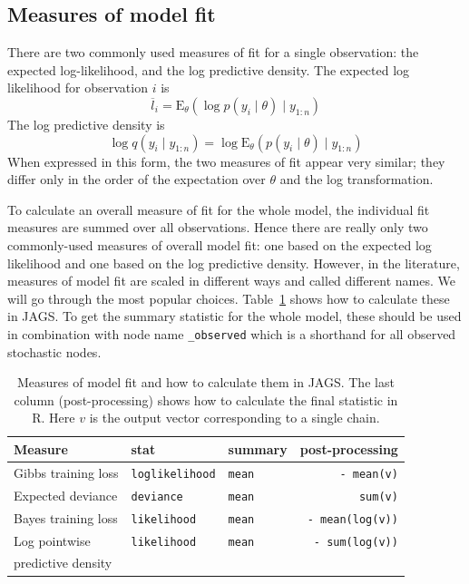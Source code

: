 \documentclass[11pt, a4paper, titlepage]{report}
\newcommand{\JAGS}{\textsf{JAGS}}
\begin{document}
{\subsection{Measures of model fit}
\label{section:fit_measures}

There are two commonly used measures of fit for a single observation:
the expected log-likelihood, and the log predictive density. The
expected log likelihood for observation $i$ is
\[
\overline{l}_i = \text{E}_{\theta} \left( \log p(y_i \mid \theta) \mid y_{1:n}\right)
\]
The log predictive density is
\[
\log q(y_i \mid y_{1:n}) = \log \text{E}_{\theta} \left( p(y_i \mid \theta) \mid y_{1:n} \right)
\]
When expressed in this form, the two measures of fit appear very
similar; they differ only in the order of the expectation over
$\theta$ and the log transformation.

To calculate an overall measure of fit for the whole model, the
individual fit measures are summed over all observations. Hence there
are really only two commonly-used measures of overall model fit: one
based on the expected log likelihood and one based on the log
predictive density. However, in the literature, measures of model fit
are scaled in different ways and called different names. We will go
through the most popular choices. Table~\ref{table:fit_measures} shows
how to calculate these in \JAGS. To get the summary statistic for the
whole model, these should be used in combination with node name
\texttt{\_observed} which is a shorthand for all observed stochastic
nodes.

\begin{table}[h]
  \centering
\begin{tabular}{lllr}
  \hline
  Measure             & stat                  & summary    & post-processing \\
  \hline
  Gibbs training loss & {\tt loglikelihood}   & {\tt mean} & {\tt - mean(v)} \\
  Expected deviance   & {\tt deviance}        & {\tt mean} & {\tt sum(v)} \\
  Bayes training loss & {\tt likelihood}      & {\tt mean} & {\tt - mean(log(v))} \\
  Log pointwise       & {\tt likelihood}      & {\tt mean} & {\tt - sum(log(v))} \\
  predictive density  &                       &            & \\
  \hline
\end{tabular}
\caption{\label{table:fit_measures} Measures of model fit and how to calculate them in \JAGS.
  The last column (post-processing) shows how to calculate the final statistic in R. Here
  $v$ is the output vector corresponding to a single chain.}
\end{table}

}
\end{document}
